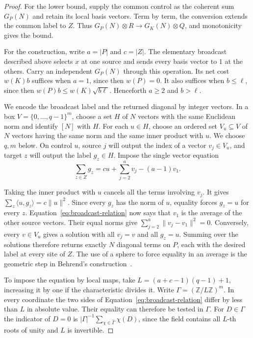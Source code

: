 \begin{proof}
For the lower bound, supply the common control as the coherent sum
\(G_P(N)\) and retain its local basis vectors. Term by term, the conversion
extends the common label to \(Z\). Thus
\(G_P(N)\otimes R\longrightarrow G_K(N)\otimes Q\), and monotonicity
gives the bound.

For the construction, write \(a=|P|\) and \(c=|Z|\). The elementary
broadcast described above selects \(x\) at one source and sends every
basis vector to \(1\) at the others. Carry an independent \(G_P(N)\)
through this operation. Its net cost \(w(K)b\) suffices when \(a=1\),
since then \(w(P)=0\). It also suffices when \(b\le\ell\), since then
\(w(P)b\le w(K)\sqrt{b\ell}\). Henceforth \(a\ge2\) and \(b>\ell\).

We encode the broadcast label and the returned diagonal by integer
vectors. In a box \(V=\{0,\ldots,q-1\}^m\), choose a set \(H\) of
\(N\) vectors with the same Euclidean norm and identify \([N]\) with \(H\).
For each \(u\in H\), choose an ordered set \(V_u\subseteq V\) of \(N\)
vectors having the same norm and the same inner product with \(u\).
We choose \(q,m\) below. On control \(u\), source \(j\) will output
the index of a vector \(v_j\in V_u\), and target \(z\) will output
the label \(g_z\in H\). Impose the single vector equation
\begin{equation}\label{eq:broadcast-relation}
  \sum_{z\in Z}g_z=cu+\sum_{j=2}^a v_j-(a-1)v_1 .
\end{equation}

Taking the inner product with \(u\) cancels all the terms involving
\(v_j\). It gives \(\sum_z\langle u,g_z\rangle=c\|u\|^2\).
Since every \(g_z\) has the norm of \(u\), equality forces \(g_z=u\)
for every \(z\). Equation~\eqref{eq:broadcast-relation} now says that
\(v_1\) is the average of the other source vectors. Their equal norms
give \(\sum_{j=2}^a\|v_j-v_1\|^2=0\). Conversely, every
\(v\in V_u\) gives a solution with all \(v_j=v\) and all \(g_z=u\).
Summing over the solutions therefore returns exactly \(N\) diagonal
terms on \(P\), each with the desired label at every site of \(Z\).
The use of a sphere to force equality in an average is the geometric
step in Behrend's construction~\cite{Behrend}.

To impose the equation by local maps, take \(L=(a+c-1)(q-1)+1\),
increasing it by one if the characteristic divides it. Write
\(\Gamma=(\mathbb Z/L\mathbb Z)^m\). In every coordinate the two
sides of Equation~\eqref{eq:broadcast-relation} differ by less than
\(L\) in absolute value. Their equality can therefore be tested in
\(\Gamma\). For \(D\in\Gamma\) the indicator of \(D=0\) is
\(|\Gamma|^{-1}\sum_{\chi\in\widehat\Gamma}\chi(D)\), since the
field contains all \(L\)-th roots of unity and \(L\) is invertible.


\end{proof}
